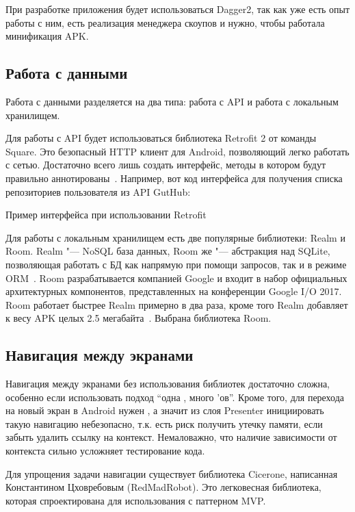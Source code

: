 При разработке приложения будет использоваться Dagger2, так как уже есть опыт работы с ним, есть реализация менеджера скоупов и нужно, чтобы работала минификация APK\@.

\subsection{Работа с данными}
\label{subsec:workWithData}
Работа с данными разделяется на два типа: работа с API и работа с локальным хранилищем.

Для работы с API будет использоваться библиотека Retrofit 2 от команды Square.
Это безопасный HTTP клиент для Android, позволяющий легко работать с сетью.
Достаточно всего лишь создать интерфейс, методы в котором будут правильно аннотированы~\cite{retrofit}.
Например, вот код интерфейса для получения списка репозиториев пользователя из API GutHub:

\begin{listing}[H]
  \caption{Пример интерфейса при использовании Retrofit}
  \label{lst:retrofitKt}
\end{listing}

Для работы с локальным хранилищем есть две популярные библиотеки: Realm и Room.
Realm "--- NoSQL база данных, Room же "--- абстракция над SQLite, позволяющая работать с БД как напрямую при помощи запросов, так и в режиме ORM~\cite{realm,android:room}.
Room разрабатывается компанией Google и входит в набор официальных архитектурных компонентов, представленных на конференции Google I/O 2017.
Room работает быстрее Realm примерно в два раза, кроме того Realm добавляет к весу APK целых 2.5 мегабайта~\cite{github:dbBench}.
Выбрана библиотека Room.

\subsection{Навигация между экранами}
\label{subsec:navigation}
Навигация между экранами без использования библиотек достаточно сложна, особенно если использовать подход ``одна , много 'ов''.
Кроме того, для перехода на новый экран в Android нужен , а значит из слоя Presenter инициировать такую навигацию небезопасно, т.к. есть риск получить утечку памяти, если забыть удалить ссылку на контекст.
Немаловажно, что наличие зависимости от контекста сильно усложняет тестирование кода.

Для упрощения задачи навигации существует библиотека Cicerone, написанная Константином Цховребовым (RedMadRobot).
Это легковесная библиотека, которая спроектирована для использования с паттерном MVP\@.

